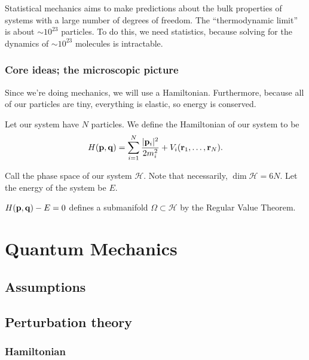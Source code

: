 \documentclass[11pt]{article}
\begin{document}
Statistical mechanics aims to make predictions about the bulk properties
of systems with a large number of degrees of freedom. The ``thermodynamic
limit'' is about $\sim 10^{23}$ particles.  To do this, we need statistics, 
because solving for the dynamics of $\sim 10^{23}$ molecules is intractable.

\subsubsection{Core ideas; the microscopic picture}

Since we're doing mechanics, we will use a Hamiltonian. Furthermore,
because all of our particles are tiny, everything is elastic, so energy
is conserved.

\begin{definition}
    Let our system have $N$ particles. We define the Hamiltonian of our system to be
    \begin{align*}
        H(\mathbf{p}, \mathbf{q}) = \sum_{i = 1}^{N} \frac{|\mathbf{p}_i|^2}{2m_i^2} + V_i(\mathbf{r}_1, \ldots, \mathbf{r}_{N}).
    \end{align*}
\end{definition}

\begin{definition}
    Call the phase space of our system $\mathcal{H}$. Note that necessarily,
    $\dim{\mathcal{H}} = 6N$. Let the energy of the system be $E$.
\end{definition}

$H(\mathbf{p}, \mathbf{q}) - E = 0$ defines a submanifold $\Omega \subset \mathcal{H}$
by the Regular Value Theorem.
\newpage

\section{Quantum Mechanics}

\subsection{Assumptions}


\subsection{Perturbation theory}

\subsubsection{Hamiltonian}
\end{document}
